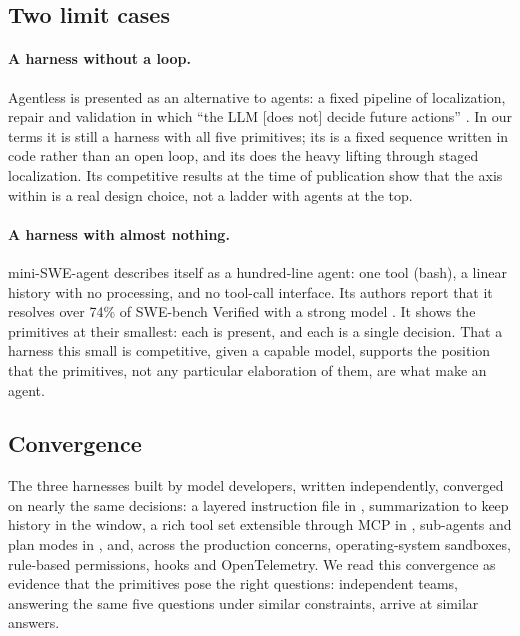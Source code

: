 \subsection{Two limit cases}

\paragraph{A harness without a loop.} Agentless is presented as an alternative to agents: a fixed pipeline of localization, repair and validation in which ``the LLM [does not] decide future actions'' \citep{xia2024agentless}. In our terms it is still a harness with all five primitives; its  is a fixed sequence written in code rather than an open loop, and its  does the heavy lifting through staged localization. Its competitive results at the time of publication show that the axis within  is a real design choice, not a ladder with agents at the top.

\paragraph{A harness with almost nothing.} mini-SWE-agent describes itself as a hundred-line agent: one tool (bash), a linear history with no processing, and no tool-call interface. Its authors report that it resolves over 74\% of SWE-bench Verified with a strong model \citep{minisweagent}. It shows the primitives at their smallest: each is present, and each is a single decision. That a harness this small is competitive, given a capable model, supports the position that the primitives, not any particular elaboration of them, are what make an agent.

\subsection{Convergence}

The three harnesses built by model developers, written independently, converged on nearly the same decisions: a layered instruction file in , summarization to keep history in the window, a rich tool set extensible through MCP in , sub-agents and plan modes in , and, across the production concerns, operating-system sandboxes, rule-based permissions, hooks and OpenTelemetry. We read this convergence as evidence that the primitives pose the right questions: independent teams, answering the same five questions under similar constraints, arrive at similar answers.
